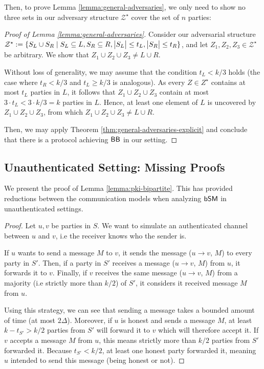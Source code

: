 Then, to prove Lemma \ref{lemma:general-adversaries}, we only need to show no three sets in our 
adversary structure $\mathcal{Z}^\star$ cover the set of $n$ parties:
\begin{proof}[Proof of Lemma \ref{lemma:general-adversaries}]
Consider our adversarial structure $\mathcal{Z^\star} := \{S_L \cup S_R \mid S_L \subseteq L, S_R \subseteq R, \big\lvert S_L\big\rvert \leq t_L, \big\lvert S_R\big\rvert \leq t_R\}$, and let $Z_1, Z_2, Z_3 \in \mathcal{Z^\star}$ be arbitrary. We show that $Z_1 \cup Z_2 \cup Z_3 \neq L \cup R$.


Without loss of generality, we may assume that the condition $t_L < k / 3$ holds (the case where $t_R < k / 3$ and $t_L \geq k / 3$ is analogous). As every $Z \in Z^\star$ contains at most $t_L$ parties in $L$, it follows that $Z_1 \cup Z_2 \cup Z_3$ contain at most $3 \cdot t_L < 3 \cdot k / 3 = k$ parties in $L$. Hence, at least one element of $L$ is uncovered by $Z_1 \cup Z_2 \cup Z_3$, from which $Z_1 \cup Z_2 \cup Z_3 \neq L \cup R$.

Then, we may apply Theorem \ref{thm:general-adversaries-explicit} and conclude that there is a protocol achieving $\textsf{BB}$ in our setting.
\end{proof}

\subsection{Unauthenticated Setting: Missing Proofs}\label{appendix:complete-bipartite-graph-without-pki}
We present the proof of Lemma \ref{lemma:pki-bipartite}. This has provided reductions between the communication models when analyzing $\textsf{bSM}$ in unauthenticated settings.
\BipartiteCommunicationNoPKI*

\begin{proof}
Let $u,v$ be parties in $S$. We want to simulate an authenticated channel between $u$ and $v$, i.e the receiver knows who the sender is. 

If $u$ wants to send a message $M$ to $v$, it sends the message ($u \rightarrow v$, $M$) to every party in $S'$. Then, if a party in $S'$ receives a message ($u \rightarrow v$, $M$) from $u$, it forwards it to $v$. Finally, if $v$ receives the same message ($u \rightarrow v$, $M$) from a majority (i.e strictly more than $k/2$) of $S'$, it considers it received message $M$ from $u$.

Using this strategy, we can see that sending a message takes a bounded amount of time (at most $2 \Delta$). Moreover, if $u$ is honest and sends a message $M$, at least $k - t_{S'} > k/2$ parties from $S'$ will forward it to $v$ which will therefore accept it.
If $v$ accepts a message $M$ from $u$, this means strictly more than $k/2$ parties from $S'$ forwarded it. Because $t_{S'} < k/2$, at least one honest party forwarded it, meaning $u$ intended to send this message (being honest or not).
\end{proof}

